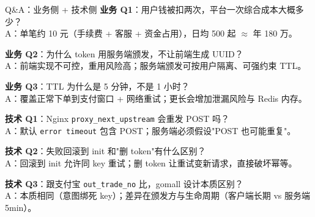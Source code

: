 \appendix

\begin{frame}{Q\&A：业务侧 + 技术侧}
\scriptsize
\textbf{业务 Q1}：用户钱被扣两次，平台一次综合成本大概多少？\\
\hspace{3mm}A：单笔约 10 元（手续费 + 客服 + 资金占用），日均 500 起 $\approx$ 年 180 万。

\vspace{0.8mm}
\textbf{业务 Q2}：为什么 token 用服务端颁发，不让前端生成 UUID？\\
\hspace{3mm}A：前端实现不可控，重用风险高；服务端颁发可按用户隔离、可强约束 TTL。

\vspace{0.8mm}
\textbf{业务 Q3}：TTL 为什么是 5 分钟，不是 1 小时？\\
\hspace{3mm}A：覆盖正常下单到支付窗口 + 网络重试；更长会增加泄漏风险与 Redis 内存。

\vspace{1.5mm}
\textbf{技术 Q1}：Nginx \texttt{proxy\_next\_upstream} 会重发 POST 吗？\\
\hspace{3mm}A：默认 \texttt{error timeout} 包含 POST；服务端必须假设"POST 也可能重复"。

\vspace{0.8mm}
\textbf{技术 Q2}：失败回滚到 init 和"删 token"有什么区别？\\
\hspace{3mm}A：回滚到 init 允许同 key 重试；删 token 让重试变新请求，直接破坏幂等。

\vspace{0.8mm}
\textbf{技术 Q3}：跟支付宝 \texttt{out\_trade\_no} 比，gomall 设计本质区别？\\
\hspace{3mm}A：本质相同（意图绑死 key）；差异在颁发方与生命周期（客户端长期 vs 服务端 5min）。
\end{frame}

